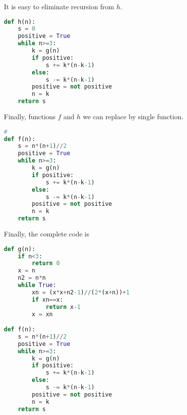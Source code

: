 \documentclass[a4paper]{article}
\begin{document}
It is easy to eliminate recursion from $h$.

\begin{lstlisting}[language=Python]
def h(n):
	s = 0
	positive = True
	while n>=3:
		k = g(n)
		if positive:
			s += k*(n-k-1)
		else:
			s -= k*(n-k-1)
		positive = not positive
		n = k
	return s
\end{lstlisting}

Finally, functions $f$ and $h$ we can replace by single function.

\begin{lstlisting}[language=Python]
# 
def f(n):
	s = n*(n+1)//2
	positive = True
	while n>=3:
		k = g(n)
		if positive:
			s += k*(n-k-1)
		else:
			s -= k*(n-k-1)
		positive = not positive
		n = k
	return s
\end{lstlisting}

Finally, the complete code is

\begin{lstlisting}[language=Python]
def g(n):
	if n<3:
		return 0
	x = n
	n2 = n*n
	while True:
		xn = (x*x+n2-1)//(2*(x+n))+1
		if xn==x:
			return x-1
		x = xn

def f(n):
	s = n*(n+1)//2
	positive = True
	while n>=3:
		k = g(n)
		if positive:
			s += k*(n-k-1)
		else:
			s -= k*(n-k-1)
		positive = not positive
		n = k
	return s
\end{lstlisting}
\end{document}
